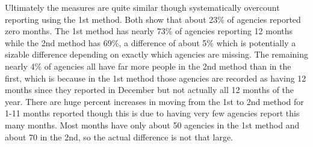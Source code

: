 \documentclass[
  12pt,
  openany]{book}
\begin{document}
Ultimately the measures are quite similar though systematically overcount reporting using the 1st method. Both show that about 23\% of agencies reported zero months. The 1st method has nearly 73\% of agencies reporting 12 months while the 2nd method has 69\%, a difference of about 5\% which is potentially a sizable difference depending on exactly which agencies are missing. The remaining nearly 4\% of agencies all have far more people in the 2nd method than in the first, which is because in the 1st method those agencies are recorded as having 12 months since they reported in December but not actually all 12 months of the year. There are huge percent increases in moving from the 1st to 2nd method for 1-11 months reported though this is due to having very few agencies report this many months. Most months have only about 50 agencies in the 1st method and about 70 in the 2nd, so the actual difference is not that large.
\end{document}
